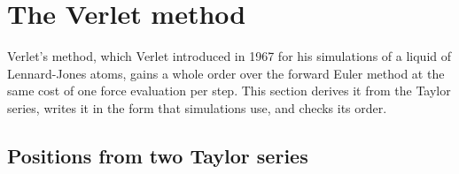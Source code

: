 \section{The Verlet method}
\label{sec:in-verlet}

Verlet's method, which Verlet introduced in 1967 for his simulations of a
liquid of Lennard-Jones atoms\cite{Verlet1967}, gains a whole order over the forward
Euler method at the same cost of one force evaluation per step. This
section derives it from the Taylor series, writes it in the form that
simulations use, and checks its order.

\subsection*{Positions from two Taylor series}

